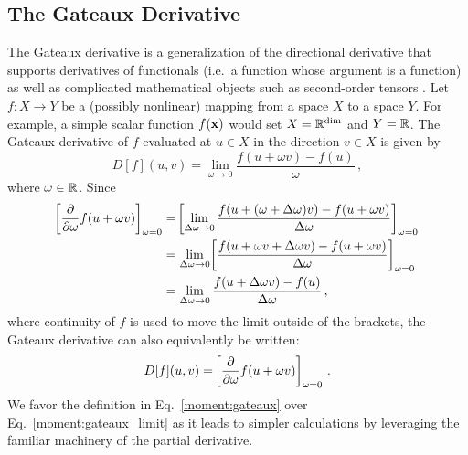 \documentclass[../doc.tex]{subfiles}
\begin{document}
\subsection{The Gateaux Derivative}
The Gateaux derivative is a generalization of the directional derivative that supports derivatives of functionals (i.e.~a function whose argument is a function) as well as complicated mathematical objects such as second-order tensors \cite{vainberg64}. Let $f : X\rightarrow Y$ be a (possibly nonlinear) mapping from a space $X$ to a space $Y$. For example, a simple scalar function $f(\boldsymbol{\mathrm{x}})$ would set $X = \mathbb{R}^{\dim}$ and $Y = \mathbb{R}$. The Gateaux derivative of $f$ evaluated at $u\in X$ in the direction $v \in X$ is given by 
	\begin{equation} \label{moment:gateaux_limit}
		D[f](u,v) = \lim_{\omega\rightarrow 0} \frac{f(u+\omega v) - f(u)}{\omega} \,,
	\end{equation}
where $\omega\in \mathbb{R}$. Since 
	\begin{equation}
	\begin{aligned}
		\!\left[ \frac{\partial }{\partial \omega}f(u + \omega v) \right]_{\omega=0} &= \!\left[ \lim_{\Delta\omega \rightarrow 0} \frac{f(u+(\omega+\Delta\omega)v) - f(u + \omega v)}{\Delta\omega} \right]_{\omega=0} \\
		&= \lim_{\Delta\omega \rightarrow 0}\!\left[ \frac{f(u + \omega v + \Delta\omega v) - f(u + \omega v)}{\Delta\omega} \right]_{\omega=0} \\
		&= \lim_{\Delta\omega\rightarrow 0} \frac{f(u + \Delta\omega v) - f(u)}{\Delta\omega} \,,
	\end{aligned}
	\end{equation}
where continuity of $f$ is used to move the limit outside of the brackets, the Gateaux derivative can also equivalently be written: 
	\begin{equation} \label{moment:gateaux}
		D[f](u,v) = \!\left[ \frac{\partial }{\partial \omega}f(u + \omega v) \right]_{\omega=0} \,. 
	\end{equation}
We favor the definition in Eq.~\ref{moment:gateaux} over Eq.~\ref{moment:gateaux_limit} as it leads to simpler calculations by leveraging the familiar machinery of the partial derivative. 
\end{document}
